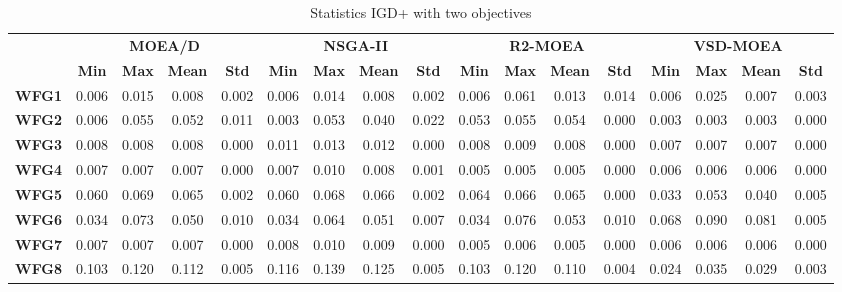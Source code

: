 
\begin{table*}[t]
\caption{Statistics IGD+ with two objectives}
\label{tab:StatisticsIGDP_2obj}
\begin{tabular}{c|c|c|c|c|c|c|c|c|c|c|c|c|c|c|c|c|}
\cline{2-17}
 & \multicolumn{4}{c|}{\textbf{MOEA/D}} & \multicolumn{4}{c|}{\textbf{NSGA-II}} & \multicolumn{4}{c|}{\textbf{R2-MOEA}} & \multicolumn{4}{c|}{\textbf{VSD-MOEA}} \\ \cline{2-17} 
 & \textbf{Min} & \textbf{Max} & \textbf{Mean} & \textbf{Std} & \textbf{Min} & \textbf{Max} & \textbf{Mean} & \textbf{Std} & \textbf{Min} & \textbf{Max} & \textbf{Mean} & \textbf{Std} & \textbf{Min} & \textbf{Max} & \textbf{Mean} & \textbf{Std} \\ \hline
\multicolumn{1}{|c|}{\textbf{WFG1}} & 0.006 & 0.015 & 0.008 & 0.002 & 0.006 & 0.014 & 0.008 & 0.002 & 0.006 & 0.061 & 0.013 & 0.014 & 0.006 & 0.025 & 0.007 & 0.003 \\ \hline
\multicolumn{1}{|c|}{\textbf{WFG2}} & 0.006 & 0.055 & 0.052 & 0.011 & 0.003 & 0.053 & 0.040 & 0.022 & 0.053 & 0.055 & 0.054 & 0.000 & 0.003 & 0.003 & 0.003 & 0.000 \\ \hline
\multicolumn{1}{|c|}{\textbf{WFG3}} & 0.008 & 0.008 & 0.008 & 0.000 & 0.011 & 0.013 & 0.012 & 0.000 & 0.008 & 0.009 & 0.008 & 0.000 & 0.007 & 0.007 & 0.007 & 0.000 \\ \hline
\multicolumn{1}{|c|}{\textbf{WFG4}} & 0.007 & 0.007 & 0.007 & 0.000 & 0.007 & 0.010 & 0.008 & 0.001 & 0.005 & 0.005 & 0.005 & 0.000 & 0.006 & 0.006 & 0.006 & 0.000 \\ \hline
\multicolumn{1}{|c|}{\textbf{WFG5}} & 0.060 & 0.069 & 0.065 & 0.002 & 0.060 & 0.068 & 0.066 & 0.002 & 0.064 & 0.066 & 0.065 & 0.000 & 0.033 & 0.053 & 0.040 & 0.005 \\ \hline
\multicolumn{1}{|c|}{\textbf{WFG6}} & 0.034 & 0.073 & 0.050 & 0.010 & 0.034 & 0.064 & 0.051 & 0.007 & 0.034 & 0.076 & 0.053 & 0.010 & 0.068 & 0.090 & 0.081 & 0.005 \\ \hline
\multicolumn{1}{|c|}{\textbf{WFG7}} & 0.007 & 0.007 & 0.007 & 0.000 & 0.008 & 0.010 & 0.009 & 0.000 & 0.005 & 0.006 & 0.005 & 0.000 & 0.006 & 0.006 & 0.006 & 0.000 \\ \hline
\multicolumn{1}{|c|}{\textbf{WFG8}} & 0.103 & 0.120 & 0.112 & 0.005 & 0.116 & 0.139 & 0.125 & 0.005 & 0.103 & 0.120 & 0.110 & 0.004 & 0.024 & 0.035 & 0.029 & 0.003 \\ \hline

\end{tabular}
\end{table*}
